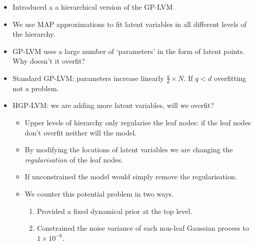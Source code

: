\documentclass[english,color,smalltitle]{manchesterposter}
\begin{document}
\begin{multicols}{5}{\LARGE \par}
\begin{columnbox}

\begin{itemize}
\item Introduced a a hierarchical version of the GP-LVM{\large \par}
\item We use MAP approximations to fit latent variables in all different
levels of the hierarchy.{\large \par}
\end{itemize}
\end{columnbox}


\begin{columnbox}
\-


\begin{itemize}
\item GP-LVM uses a large number of `parameters' in the form of latent points.
Why doesn't it overfit?{\large \par}
\item Standard GP-LVM: parameters increase linearly $\frac{q}{d}\times N$.
If $q<d$ overfitting not a problem.{\large \par}
\item HGP-LVM: we are adding more latent variables, will we overfit? {\large \par}

\begin{itemize}
\item Upper levels of hierarchy only regularise the leaf nodes: if the leaf
nodes don't overfit neither will the model.{\large \par}
\item By modifying the locations of latent variables we are changing the
\emph{regularisation} of the leaf nodes.{\large \par}
\item If unconstrained the model would simply remove the regularisation.{\large \par}
\item We counter this potential problem in two ways. {\large \par}

\begin{enumerate}
\item Provided a fixed dynamical prior at the top level. {\large \par}
\item Constrained the noise variance of each non-leaf Gaussian process to
$1\times10^{-6}$.{\large \par}
\end{enumerate}
\end{itemize}
\end{itemize}
\end{columnbox}



\end{multicols}
\end{document}
